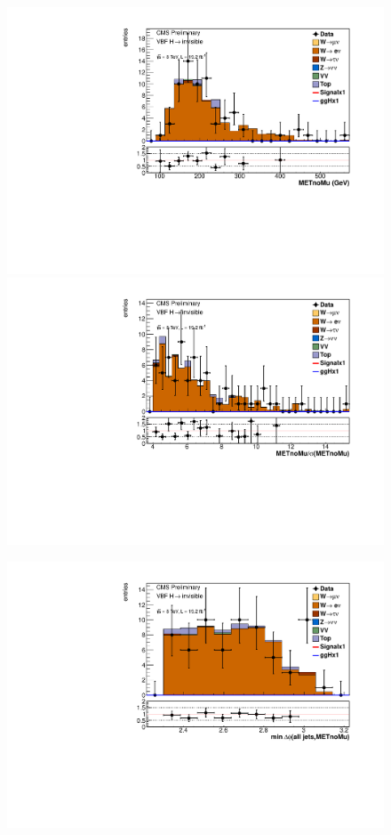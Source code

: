 \begin{figure}
  \includegraphics[width=.6\largefigwidth]{plots/parked/AN-14-243-figs/output_sigreg/enu_metnomuons.pdf}
  \includegraphics[width=.6\largefigwidth]{plots/parked/AN-14-243-figs/output_sigreg/enu_metnomu_significance.pdf}

  \includegraphics[width=.6\largefigwidth]{plots/parked/AN-14-243-figs/output_sigreg/enu_alljetsmetnomu_mindphi.pdf}

  \caption{}%
  \label{fig:parkedwenu}
\end{figure}

